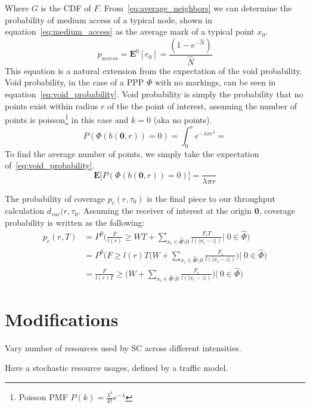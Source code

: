 %
Where $G$ is the CDF of $F$.  From~\eqref{eq:average_neighbors} we can determine the probability of medium access of a typical node, shown in equation~\eqref{eq:medium_access} as the average mark of a typical point $x_0$.
%
\begin{equation}\label{eq:medium_access}
	p_{access} = \textbf{E}^0[e_0] = \frac{(1-e^{-\hat{N}})}{\hat{N}}
\end{equation}
%
This equation is a natural extension from the expectation of the void probability. Void probability, in the case of a PPP $\Phi$ with no markings, can be seen in equation~\eqref{eq:void_probability}.  Void probability is simply the probability that no points exist within radius $r$ of the the point of interest, assuming the number of points is poisson\footnote{Poisson PMF $P(k)=\frac{\lambda^k}{k!}e^{-\lambda}$}  in this case and $k=0$ (aka no points).
%
\begin{equation}\label{eq:void_probability}
	P(\Phi(b(\textbf{0},r))=0) = \int_0^r e^{-\lambda \pi r^2} =
\end{equation}
%
To find the average number of points, we simply take the expectation of~\eqref{eq:void_probability}.
%
\begin{equation}\label{eq:mean_void_probability}
	\textbf{E}\big[P(\Phi(b(\textbf{0},r))=0)\big] = \frac{}{\lambda \pi r}
\end{equation}
\par
%
The probability of coverage $p_c(r,\tau_0)$ is the final piece to our throughput calculation $d_{suc}(r,\tau_0$.  Assuming the receiver of interest at the origin $\textbf{0}$, coverage probability is written as the following:
%
\begin{equation}
	\begin{split}
	p_c(r,T) &= P^0\Bigg(\frac{F}{l(r)} \geq WT + \sum_{x_i \in \hat{\Phi} \setminus 0} \frac{F_i T} {l(|x_i-z|)} |\;0 \in \hat{\Phi} \Bigg) \\
	&= P^0\Bigg( F \geq l(r) T \Bigg( W + \sum_{x_i \in \hat{\Phi} \setminus 0} \frac{F_i} {l(|x_i-z|)} \Bigg) |\;0 \in \hat{\Phi} \Bigg) \\
	&= \frac{F}{l(r) T} \geq \Bigg( W + \sum_{x_i \in \hat{\Phi} \setminus 0} \frac{F_i} {l(|x_i-z|)} \Bigg) |\;0 \in \hat{\Phi} \Bigg)
	\end{split}
\end{equation}
%
\section{Modifications}
%
Vary number of resources used by SC across different intensities.\par
%
Have a stochastic resource usages, defined by a traffic model.\par
%
